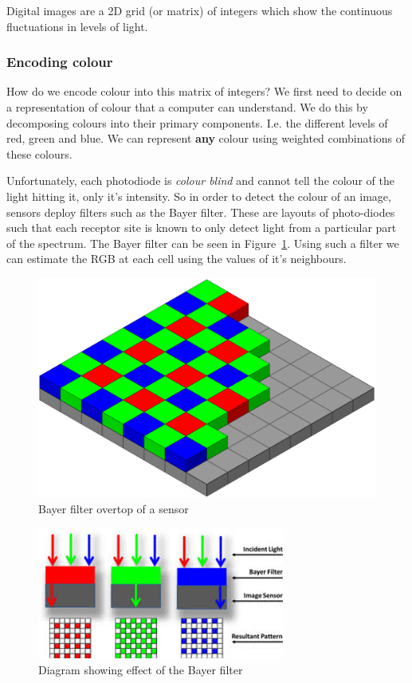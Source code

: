 \documentclass{article}
\begin{document}
Digital images are a 2D grid (or matrix) of integers which show the continuous fluctuations in levels of light.

\subsubsection{Encoding colour}

How do we encode colour into this matrix of integers? We first need to decide on a representation of colour that a computer can understand. We do this by decomposing colours into their primary components. I.e. the different levels of red, green and blue. We can represent \textbf{any} colour using weighted combinations of these colours.

Unfortunately, each photodiode is \textit{colour blind} and cannot tell the colour of the light hitting it, only it's intensity. So in order to detect the colour of an image, sensors deploy filters such as the Bayer filter. These are layouts of photo-diodes such that each receptor site is known to only detect light from a particular part of the spectrum. The Bayer filter can be seen in Figure~\ref{fig:bayer1}. Using such a filter we can estimate the RGB at each cell using the values of it's neighbours.

\begin{figure}[ht]
  \centering
  \includegraphics[scale=0.1]{figures/bayer1.png}
  \caption{\label{fig:bayer1} Bayer filter overtop of a sensor}
\end{figure}

\begin{figure}[ht]
  \centering
  \includegraphics[scale=0.5]{figures/bayer2.jpeg}
  \caption{\label{fig:bayer2} Diagram showing effect of the Bayer filter}
\end{figure}
\end{document}
